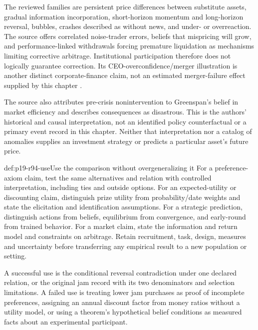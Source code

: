 The reviewed families are persistent price differences between substitute
assets, gradual information incorporation, short-horizon momentum and
long-horizon reversal, bubbles, crashes described as without news, and
under- or overreaction. The source offers correlated noise-trader errors,
beliefs that mispricing will grow, and performance-linked withdrawals
forcing premature liquidation as mechanisms limiting corrective arbitrage.
Institutional participation therefore does not logically guarantee
correction. Its CEO-overconfidence/merger illustration is another distinct
corporate-finance claim, not an estimated merger-failure effect supplied
by this chapter \cite[pp.~573--574, note~11]{DhamiAlNowaihi2021Economics}.

The source also attributes pre-crisis nonintervention to Greenspan's belief
in market efficiency and describes consequences as disastrous. This is
the authors' historical and causal interpretation, not an identified
policy counterfactual or a primary event record in this chapter. Neither
that interpretation nor a catalog of anomalies supplies an investment
strategy or predicts a particular asset's future price.

\begin{hbmethod}{def:p19-r94-use}{Use the comparison without overgeneralizing it}
For a preference-axiom claim, test the same alternatives and relation
with controlled interpretation, including ties and outside options. For
an expected-utility or discounting claim, distinguish prize utility from
probability/date weights and state the elicitation and identification
assumptions. For a strategic prediction, distinguish actions from beliefs,
equilibrium from convergence, and early-round from trained behavior.
For a market claim, state the information and return model and constraints
on arbitrage. Retain recruitment, task, design, measures and uncertainty
before transferring any empirical result to a new population or setting.

A successful use is the conditional reversal contradiction under one
declared relation, or the original jam record with its two denominators
and selection limitations. A failed use is treating lower jam purchases
as proof of incomplete preferences, assigning an annual discount factor
from money ratios without a utility model, or using a theorem's hypothetical
belief conditions as measured facts about an experimental participant.
\end{hbmethod}

